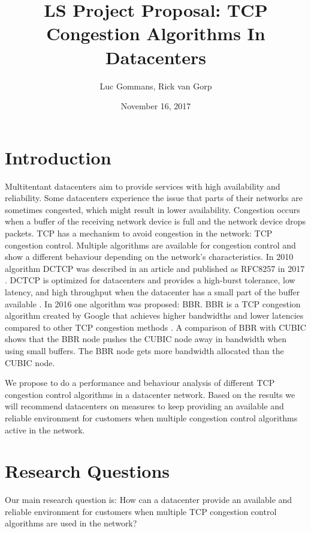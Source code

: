 \documentclass{article}
\title{LS Project Proposal: TCP Congestion Algorithms In Datacenters}
\date{November 16, 2017}
\author{Luc Gommans, Rick van Gorp}
\begin{document}
\maketitle

\section{Introduction}

Multitentant datacenters aim to provide services with high availability and
reliability. Some datacenters experience the issue that parts of their networks
are sometimes congested, which might result in lower availability. Congestion
occurs when a buffer of the receiving network device is full and the network
device drops packets. TCP has a mechanism to avoid congestion in the network:
TCP congestion control. Multiple algorithms are available for congestion
control and show a different behaviour depending on the network's
characteristics. In 2010 algorithm DCTCP was described in an article
\cite{dctcp-congestion-original} and published as RFC8257 in 2017
\cite{dctcp-congestion}. DCTCP is optimized for datacenters and provides a
high-burst tolerance, low latency, and high throughput when the datacenter has
a small part of the buffer available \cite{dctcp-congestion}. In 2016 one
algorithm was proposed: BBR. BBR is a TCP congestion algorithm created by
Google that achieves higher bandwidths and lower latencies compared to other
TCP congestion methods \cite{bbr-congestion}. A comparison of BBR with CUBIC
\cite{bbr-congestion-comparison} shows that the BBR node pushes the CUBIC node
away in bandwidth when using small buffers. The BBR node gets more bandwidth
allocated than the CUBIC node.

We propose to do a performance and behaviour analysis of different TCP
congestion control algorithms in a datacenter network. Based on the results we
will recommend datacenters on measures to keep providing an available and
reliable environment for customers when multiple congestion control algorithms
active in the network.


\section{Research Questions}

Our main research question is: How can a datacenter provide an available and
reliable environment for customers when multiple TCP congestion control
algorithms are used in the network?
\end{document}
